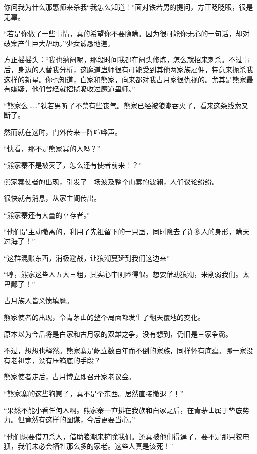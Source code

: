 
\begin{this_body}

你问我为什么那惠师来杀我“我怎么知道！”面对铁若男的提问，方正眨眨眼，很是无辜。

“若是你做了一些事情，真的希望你不要隐瞒。因为很可能你无心的一句话，却对破案产生巨大帮助。”少女诚恳地道。

方正摇摇头：“我也纳闷呢，那段时间我都在闷头修炼，怎么就招来刺杀。不过事后，身边的人替我分析，这魔道蛊师很有可能受到其他两家族雇佣，特意来扼杀我这样的新星。你也知道，白家和熊家，向来都对我古月家很仇视的。尤其是熊家最有嫌疑，他们曾经就招揽吸收过魔道蛊师。”

“熊家么……”铁若男听了不禁有些丧气。熊家已经被狼潮吞灭了，看来这条线索又断了。

然而就在这时，门外传来一阵喧哗声。

“快看，那不是熊家寨的人吗？”

“熊家寨不是被灭了，怎么还有使者前来！？”

熊家寨使者的出现，引发了一场波及整个山寨的波澜，人们议论纷纷。

很快就有消息，从家主阁传出。

“熊家寨还有大量的幸存者。”

“他们是主动撤离的，利用了先祖留下的一只蛊，同时隐去了许多人的身形，瞒天过海了！”

“这群混账东西，消极避战，让狼潮蔓延到我们这边来”

“哼，熊家这些人五大三粗，其实心中阴险得很。想要借助狼潮，来削弱我们。太卑鄙了！”

古月族人皆义愤填膺。

熊家使者的出现，令青茅山的整个局面都发生了翻天覆地的变化。

原本以为今后将是白家和古月家的双雄之争，没有想到，仍旧是三家争霸。

不过，想想也释然。熊家寨是屹立数百年而不倒的家族，同样怀有底蕴。哪一家没有老祖宗，没有压箱底的手段？

熊家使者走后，古月博立即召开家老议会。

“熊家寨的这些狗崽子，真不是个东西。居然直接撤退了！”

“果然不能小看任何人啊。熊家寨一直排在我族和白家之后，在青茅山属于垫底势力。但竟然有这样的图谋，今后更要当心。”

“他们想要借刀杀人，借助狼潮来铲除我们。还真被他们得逞了，要不是那只狡电狈，我们未必会牺牲那么多的家老。这些人真是该死！”


\end{this_body}
